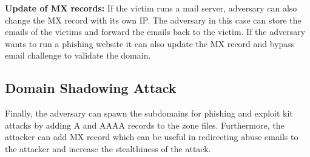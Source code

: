 \textbf{Update of MX records:} 
If the victim runs a mail server, adversary can also change the MX record with its own IP. The adversary in this case can store the emails of the victims and forward the emails back to the victim. If the adversary wants to run a phishing website it can also update the MX record and bypass email challenge to validate the domain. 







\subsection{Domain Shadowing Attack}

Finally, the adversary can spawn the subdomains for phishing and exploit kit attacks by adding A and AAAA records to the zone files. Furthermore, the attacker can add MX record which can be useful in redirecting abuse emails to the attacker and increase the stealthiness of the attack. 

